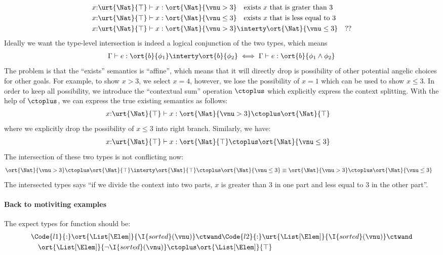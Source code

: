 \begin{align*}
  &x{:}\urt{\Nat}{\top} \vdash x : \ort{\Nat}{\vnu > 3} \quad \text{exists $x$ that is grater than $3$}
  \\&x{:}\urt{\Nat}{\top} \vdash x : \ort{\Nat}{\vnu \leq 3} \quad \text{exists $x$ that is less equal to $3$}
  \\&x{:}\urt{\Nat}{\top} \vdash x : \ort{\Nat}{\vnu > 3} \interty \ort{\Nat}{\vnu
  \leq 3} \quad ??
\end{align*}\noindent
Ideally we want the type-level intersection is indeed a logical conjunction of the two types, which means
\begin{align*}
  \Gamma \vdash e : \ort{b}{\phi_1} \interty \ort{b}{\phi_2} \iff \Gamma \vdash e : \ort{b}{\phi_1 \land \phi_2}
\end{align*}\noindent
The problem is that the ``exists'' semantics is ``affine'', which means that it will directly drop is possibility of other potential angelic choices for other goals. For example, to show $x > 3$, we select $x = 4$, however, we lose the possibility of $x = 1$ which can be used to show $x \leq 3$. In order to keep all possibility, we introduce the ``contextual sum'' operation $\ctoplus$ which explicitly express the context splitting. With the help of $\ctoplus$, we can express the true existing semantics as follows:
\begin{align*}
  &x{:}\urt{\Nat}{\top} \vdash x : \ort{\Nat}{\vnu > 3} \ctoplus \ort{\Nat}{\top}
\end{align*}\noindent
where we explicitly drop the possibility of $x \leq 3$ into right branch. Similarly, we have:
\begin{align*}
  &x{:}\urt{\Nat}{\top} \vdash x : \ort{\Nat}{\top} \ctoplus \ort{\Nat}{\vnu \leq 3}
\end{align*}\noindent
The intersection of these two types is not conflicting now:
\begin{align*}
  &\ort{\Nat}{\vnu > 3} \ctoplus \ort{\Nat}{\top} \interty \ort{\Nat}{\top} \ctoplus \ort{\Nat}{\vnu \leq 3}  \equiv \ort{\Nat}{\vnu > 3} \ctoplus \ort{\Nat}{\vnu \leq 3}
\end{align*}\noindent
The intersected types says ``if we divide the context into two parts, $x$ is greater than $3$ in one part and less equal to $3$ in the other part''.

\paragraph{Back to motiviting examples} The expect types for  function should be:
\begin{align*}
  &\Code{l1}{:}\ort{\List[\Elem]}{\I{sorted}(\vnu)} \ctwand \Code{l2}{:}\urt{\List[\Elem]}{\I{sorted}(\vnu)} \ctwand
  \\&\quad\ort{\List[\Elem]}{\neg \I{sorted}(\vnu)} \ctoplus \ort{\List[\Elem]}{\top}
\end{align*}


